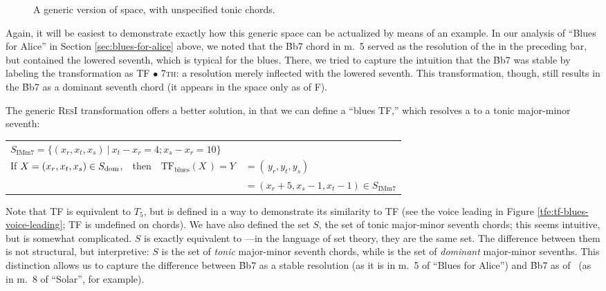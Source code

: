\begin{figure}[tbp]
  \caption{A generic version of \tf space, with unspecified tonic chords.}
  \label{tfe:generic-space}
\end{figure}

Again, it will be easiest to demonstrate exactly how this generic space can be
actualized by means of an example. In our analysis of ``Blues for Alice'' in
Section \ref{sec:blues-for-alice} above, we noted that the \h{Bb7} chord in
m.~5 served as the resolution of the \tf in the preceding bar, but contained
the lowered seventh, which is typical for the blues. There, we tried to
capture the intuition that the \h{Bb7} was stable by labeling the
transformation as TF $\bullet$ \textsc{7th}: a resolution merely inflected with
the lowered seventh. This transformation, though, still results in the \h{Bb7}
as a dominant seventh chord (it appears in the space only as \V of F).

The generic \textsc{ResI} transformation offers a better solution, in that we
can define a ``blues TF,'' which resolves a \V to a tonic major-minor
seventh: \\
%
\vspace{0.5\baselineskip}
\addtolength{\tabcolsep}{-4pt}
\begin{tabular}{lcll}
  \multicolumn{3}{l}{$S_{\mathrm{IMm7}} = \{ (x_r, x_t, x_s)\ |\ x_t - x_r = 4; x_s - x_r = 10 \}$} \\
  If $X = (x_r, x_t, x_s) \in S_{\mathrm{dom}}$, & \hspace{3pt} then \hspace{3pt}&
    $\mathrm{TF}_\mathrm{blues}(X\,) = Y$ &$= (\,y_r, y_t, y_s) $ \\
                                        &&&$= (x_r + 5, x_s - 1,
                                               x_t - 1) \in S_{\mathrm{IMm7}}$
\end{tabular}
\addtolength{\tabcolsep}{4pt}
\vspace{0.5\baselineskip}

\noindent Note that TF is equivalent to $T_5$, but is defined in a
way to demonstrate its similarity to TF (see the voice leading in Figure
\ref{tfe:tf-blues-voice-leading}; TF is undefined on \ii chords).
We have also defined the set $S$, the set of tonic major-minor
seventh chords; this seems intuitive, but is somewhat complicated.
$S$ is exactly equivalent to \Sdom---in the language of set theory,
they are the same set. The difference between them is not structural, but
interpretive: $S$ is the set of \emph{tonic} major-minor seventh
chords, while \Sdom is the set of \emph{dominant} major-minor sevenths. This
distinction allows us to capture the difference between \h{Bb7} as a stable
resolution (as it is in m.~5 of ``Blues for Alice'') and \h{Bb7} as \V of
\Eflat\ (as in m.~8 of ``Solar'', for example).

